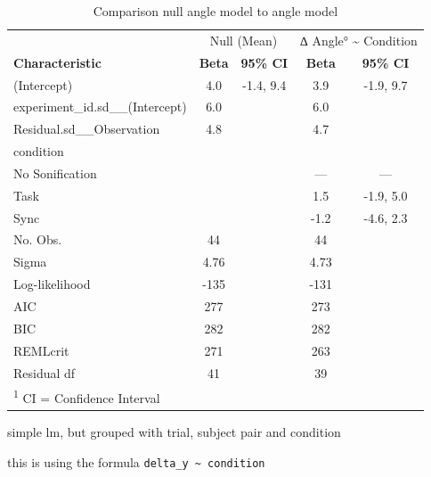 \documentclass[10pt,a4paper,onecolumn]{article}
\begin{document}
\begin{table}

\caption{\label{tab:regression-results-angle}Comparison null angle model to angle model}
\centering
\fontsize{7}{9}\selectfont
\begin{tabular}[t]{lcccc}
\toprule
\multicolumn{1}{c}{ } & \multicolumn{2}{c}{Null (Mean)} & \multicolumn{2}{c}{∆ Angle° \textasciitilde{} Condition} \\
\cmidrule(l{3pt}r{3pt}){2-3} \cmidrule(l{3pt}r{3pt}){4-5}
\textbf{Characteristic} & \textbf{Beta} & \textbf{95\% CI} & \textbf{Beta} & \textbf{95\% CI}\\
\midrule
(Intercept) & 4.0 & -1.4, 9.4 & 3.9 & -1.9, 9.7\\
experiment\_id.sd\_\_(Intercept) & 6.0 &  & 6.0 & \\
Residual.sd\_\_Observation & 4.8 &  & 4.7 & \\
condition &  &  &  & \\
\hspace{1em}No Sonification &  &  & — & —\\
\addlinespace
\hspace{1em}Task &  &  & 1.5 & -1.9, 5.0\\
\hspace{1em}Sync &  &  & -1.2 & -4.6, 2.3\\
\midrule
No. Obs. & 44 &  & 44 & \\
Sigma & 4.76 &  & 4.73 & \\
Log-likelihood & -135 &  & -131 & \\
\addlinespace
AIC & 277 &  & 273 & \\
BIC & 282 &  & 282 & \\
REMLcrit & 271 &  & 263 & \\
Residual df & 41 &  & 39 & \\
\bottomrule
\multicolumn{5}{l}{\rule{0pt}{1em}\textsuperscript{1} CI = Confidence Interval}\\
\end{tabular}
\end{table}

simple lm, but grouped with trial, subject pair and condition

this is using the formula \texttt{delta\_y\ \textasciitilde{}\ condition}
\end{document}
